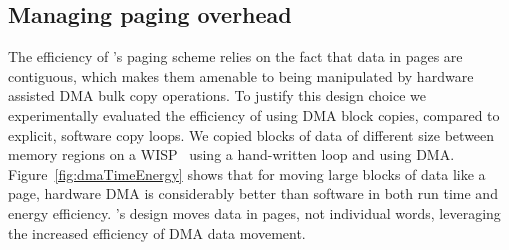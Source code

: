 \subsection{Managing paging overhead}
The efficiency of \sys's paging scheme relies on the fact that data in pages
are contiguous, which makes them amenable to being manipulated by hardware
assisted DMA bulk copy operations. To justify this design choice we
experimentally evaluated the efficiency of using DMA block copies, compared to
explicit, software copy loops.  We copied blocks of data of different size
between memory regions on a WISP~\cite{wisp} using a hand-written loop and
using DMA.  Figure~\ref{fig:dmaTimeEnergy} shows that for moving large blocks
of data like a page, hardware DMA is considerably better than software in both
run time and energy efficiency.  \sys's design moves data in pages, not
individual words, leveraging the increased efficiency of DMA data movement.
%
